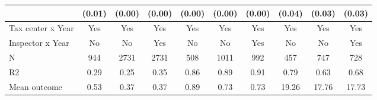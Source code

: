 \begin{tabular}{lccc|ccc|ccc}
            &      (0.01)         &      (0.00)         &      (0.00)         &      (0.00)         &      (0.00)         &      (0.00)         &      (0.04)         &      (0.03)         &      (0.03)         \\
\midrule
Tax center x Year&         Yes         &         Yes         &         Yes         &         Yes         &         Yes         &         Yes         &         Yes         &         Yes         &         Yes         \\
Inspector x Year&          No         &          No         &         Yes         &          No         &          No         &         Yes         &          No         &          No         &         Yes         \\
N           &         944         &        2731         &        2731         &         508         &        1011         &         992         &         457         &         747         &         728         \\
R2          &        0.29         &        0.25         &        0.35         &        0.86         &        0.89         &        0.91         &        0.79         &        0.63         &        0.68         \\
Mean outcome&        0.53         &        0.37         &        0.37         &        0.89         &        0.73         &        0.73         &       19.26         &       17.76         &       17.73         \\
\bottomrule \end{tabular}
